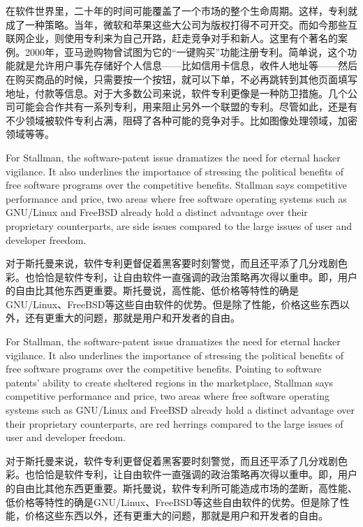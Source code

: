 \ifdefined\chs
在软件世界里，二十年的时间可能覆盖了一个市场的整个生命周期。这样，专利就成了一种策略。当年，微软和苹果这些大公司为版权打得不可开交。而如今那些互联网企业，则使用专利来为自己开路，赶走竞争对手和新人。这里有个著名的案例。2000年，亚马逊购物曾试图为它的``一键购买''功能注册专利。简单说，这个功能就是允许用户事先存储好个人信息——比如信用卡信息，收件人地址等——然后在购买商品的时候，只需要按一个按钮，就可以下单，不必再跳转到其他页面填写地址，付款等信息。对于大多数公司来说，软件专利更像是一种防卫措施。几个公司可能会合作共有一系列专利，用来阻止另外一个联盟的专利。尽管如此，还是有不少领域被软件专利占满，阻碍了各种可能的竞争对手。比如图像处理领域，加密领域等等。
\fi
\fi

\ifdefined\vtwo
\ifdefined\eng
For Stallman, the software-patent issue dramatizes the need for eternal hacker vigilance. It also underlines the importance of stressing the political benefits of free software programs over the competitive benefits. Stallman says competitive performance and price, two areas where free software operating systems such as GNU/Linux and FreeBSD already hold a distinct advantage over their proprietary counterparts, are side issues compared to the large issues of user and developer freedom.
\fi

\ifdefined\chs
对于斯托曼来说，软件专利更督促着黑客要时刻警觉，而且还平添了几分戏剧色彩。也恰恰是软件专利，让自由软件一直强调的政治策略再次得以重申。即，用户的自由比其他东西更重要。斯托曼说，高性能、低价格等特性的确是GNU/Linux、FreeBSD等这些自由软件的优势。但是除了性能，价格这些东西以外，还有更重大的问题，那就是用户和开发者的自由。
\fi
\fi

\ifdefined\vone
\ifdefined\eng
For Stallman, the software-patent issue dramatizes the need for eternal hacker vigilance. It also underlines the importance of stressing the political benefits of free software programs over the competitive benefits. Pointing to software patents' ability to create sheltered regions in the marketplace, Stallman says competitive performance and price, two areas where free software operating systems such as GNU/Linux and FreeBSD already hold a distinct advantage over their proprietary counterparts, are red herrings compared to the large issues of user and developer freedom.
\fi

\ifdefined\chs
对于斯托曼来说，软件专利更督促着黑客要时刻警觉，而且还平添了几分戏剧色彩。也恰恰是软件专利，让自由软件一直强调的政治策略再次得以重申。即，用户的自由比其他东西更重要。斯托曼说，软件专利所可能造成市场的垄断，高性能、低价格等特性的确是GNU/Linux、FreeBSD等这些自由软件的优势。但是除了性能，价格这些东西以外，还有更重大的问题，那就是用户和开发者的自由。
\fi
\fi

